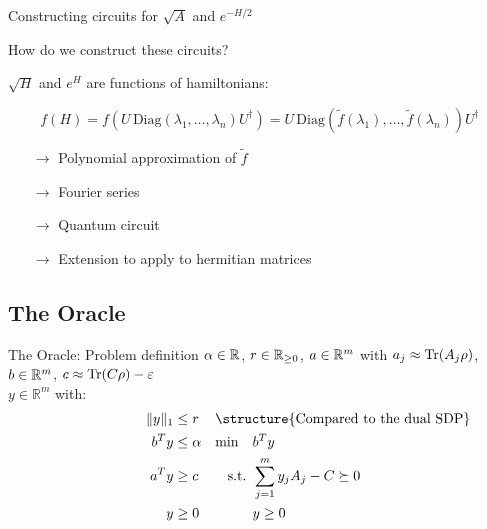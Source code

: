 \begin{frame}{Constructing circuits for  $\sqrt{A}$ and $e^{-H/2}$}
\begin{block}{How do we construct these circuits?}

$\sqrt{H}$ and $e^{H}$ are functions of hamiltonians:

\begin{equation*}
f(H)=f(U \, \mathrm{Diag} (\lambda_1,\ldots, \lambda_n) U^\dagger)=U \, \mathrm{Diag}(\tilde{f}(\lambda_1),\ldots,\tilde{f}(\lambda_n))U^\dagger
\end{equation*}

\begin{itemize}
 \item[$\to$] Polynomial approximation of $\tilde{f}$\\
 \item[$\to$] Fourier series \\
 \item[$\to$] Quantum circuit \\
 \item[$\to$] Extension to apply to hermitian matrices
\end{itemize}
\end{block}
\end{frame}

\subsection{The Oracle}

\begin{frame}{The Oracle: Problem definition}
 $\alpha\in\mathbb{R}$, $r\in \mathbb{R}_{\geq 0}$, $a\in \mathbb{R}^m$ with $a_j\approx \operatorname{Tr}(A_j \rho)$, $b\in \mathbb{R}^m$, $c\approx \operatorname{Tr}(C\rho)-\varepsilon$\\
\vspace{1cm}
 $y\in \mathbb{R}^m$ with:
\begin{align*}
\|y\|_1&\leq r & \omit\rlap{\structure{Compared to the dual SDP}}\\
b^T y&\leq \alpha&\min \quad &b^T y\\
a^T y&\geq c& \text{s.t. } &\sum_{j=1}^m y_j A_j - C\succeq 0\\
y&\geq 0 & &y\geq 0
\end{align*}

\end{frame}

